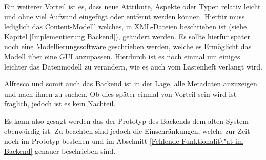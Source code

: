 Ein weiterer Vorteil ist es, dass neue Attribute, Aspekte oder Typen relativ leicht und ohne viel Aufwand eingef\"ugt oder entfernt werden k\"onnen. Hierf\"ur muss lediglich das Content-Modelll welches, in XML-Dateien beschrieben ist (siehe Kapitel \ref{Implementierung Backend}), ge\"andert werden. Es sollte hierf\"ur sp\"ater noch eine Modellierungssoftware geschrieben werden, welche es Erm\"oglicht das Modell \"uber eine GUI anzupassen. Hierdurch ist es noch einmal um einiges leichter das Datenmodell zu ver\"andern, wie es auch vom Lastenheft verlangt wird.

Alfresco und somit auch das Backend ist in der Lage, alle Metadaten anzuzeigen und nach ihnen zu suchen. Ob dies sp\"ater einmal von Vorteil sein wird ist fraglich, jedoch ist es kein Nachteil.

Es kann also gesagt werden das der Prototyp des Backends dem alten System ebenw\"urdig ist. Zu beachten sind jedoch die Einschr\"ankungen, welche zur Zeit noch im Prototyp bestehen und im Abschnitt \ref{Fehlende Funktionalit\"at im Backend} genauer beschrieben sind.